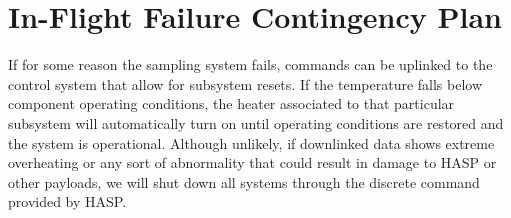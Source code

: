 \section{In-Flight Failure Contingency Plan}
\label{sec:Failure}
If for some reason the sampling system fails, commands can be uplinked to the control system that allow for subsystem resets. If the temperature falls below component operating conditions, the heater associated to that particular subsystem will automatically turn on until operating conditions are restored and the system is operational. Although unlikely, if downlinked data shows extreme overheating or any sort of abnormality that could result in damage to HASP or other payloads, we will shut down all systems through the discrete command provided by HASP.

